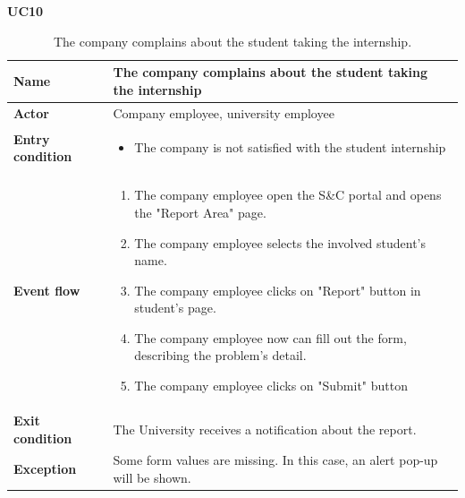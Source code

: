     \textbf{UC10}
    \nopagebreak
    \begin{table}[H]
        \centering
        \begin{tabular}{|l|p{11.9cm}|}
        \hline
        \textbf{Name}            & The company complains about the student taking the internship \\\hline
        \textbf{Actor}           & Company employee, university employee    \\\hline
        \textbf{Entry condition} &
        \begin{itemize}
              \item The company is not satisfied with the student internship
        \end{itemize}                                        \\\hline
        \textbf{Event flow}      &
        \begin{enumerate}[label=\arabic*.]
              \item The company employee open the S\&C portal and opens the "Report Area" page.
              \item The company employee selects the involved student's name.
              \item The company employee clicks on "Report" button in student's page.
              \item The company employee now can fill out the form, describing the problem's detail.
              \item The company employee clicks on "Submit" button
        \end{enumerate}            \\\hline
        \textbf{Exit condition}  & The University receives a notification about the report.\\\hline
        \textbf{Exception}       &  Some form values are missing. In this case, an alert pop-up will be shown.\\\hline
        \end{tabular}
        \caption{The company complains about the student taking the internship.}
        \label{table:The company complains about the student taking the internship}
    \end{table}

